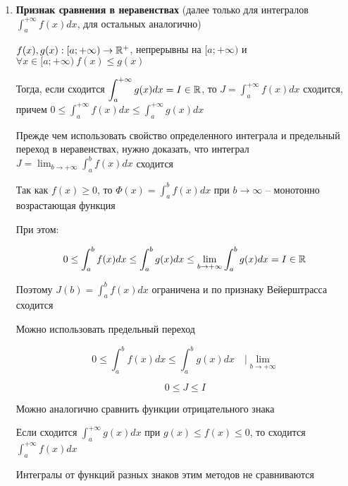 \documentclass[12pt]{article}
\begin{document}
    \hypertarget{improperintegralconvergenceininequalities}{}
    \begin{enumerate}[label*=\textbf{\arabic** }]
        \item \textbf{Признак сравнения в неравенствах} (далее только для интегралов $\displaystyle \int^{+\infty}_{a} f(x) dx$, для остальных аналогично)

        \begin{MyTheorem}
            $f(x), g(x) : [a;+\infty) \to \mathbb{R}^+$, непрерывны на $[a;+\infty)$ и $\forall x \in [a;+\infty) \ f(x) \leq g(x)$

            Тогда, если сходится $\displaystyle \int^{+\infty}_{a} g(x) dx = I \in \mathbb{R}$, то $\displaystyle J = \int^{+\infty}_{a} f(x) dx$ сходится,
            причем $\displaystyle0 \leq \int^{+\infty}_{a} f(x) dx \leq \int^{+\infty}_{a} g(x) dx$
        \end{MyTheorem}

        \begin{MyProof}
            Прежде чем использовать свойство определенного интеграла и предельный переход в неравенствах,
            нужно доказать, что интеграл $\displaystyle J = \lim_{b \to +\infty} \int^{b}_{a} f(x) dx$ сходится

            Так как $f(x) \geq 0$, то $\displaystyle \Phi(x) = \int^{b}_{a}f(x)dx$ при $b \to \infty$ -- монотонно возрастающая функция

            При этом:

            \[0 \leq \int^{b}_{a}f(x)dx \leq \int^{b}_{a}g(x)dx \leq \lim_{b \to +\infty} \int^{b}_{a}g(x)dx = I \in \mathbb{R}\]

            Поэтому $\displaystyle J(b) = \int^b_a f(x)dx$ ограничена и по признаку Вейерштрасса сходится

            Можно использовать предельный переход

            \[0 \leq \int^{b}_{a}f(x)dx \leq \int^{b}_{a}g(x)dx \quad \Big| \lim_{b \to +\infty}\]

            \[0 \leq J \leq I\]
        \end{MyProof}

        \Nota Можно аналогично сравнить функции отрицательного знака

        Если сходится $\displaystyle \int^{+\infty}_{a} g(x) dx$ при $g(x) \leq f(x) \leq 0$, то сходится $\displaystyle \int^{+\infty}_{a} f(x) dx$

        Интегралы от функций разных знаков этим методов не сравниваются


\end{enumerate}
\end{document}
